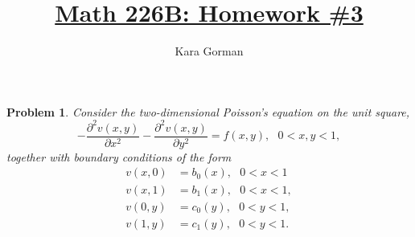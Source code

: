 \documentclass[12pt]{article}
\title{\underline{Math 226B: Homework \#3}}
\author{\huge Kara Gorman}
\newtheorem{problem}{Problem}
\begin{document}
\maketitle


\bigskip\bigskip
\noindent
\begin{problem} Consider the two-dimensional Poisson's equation on the unit square,
$$-\frac{\partial^2 v(x,y)}{\partial x^2} - \frac{\partial^2 v(x,y)}{\partial y^2} = f(x,y), \text{ } 0<x,y<1,$$
together with boundary conditions of the form
\begin{align}
v(x,0) &= b_0(x), \text{ } 0<x<1 \nonumber \\
v(x,1) &= b_1(x), \text{ } 0<x<1, \nonumber \\
v(0,y) &= c_0(y), \text{ } 0<y<1, \nonumber \\
v(1,y) &= c_1(y), \text{ } 0<y<1. \nonumber 
\end{align}
\end{problem}
\end{document}
